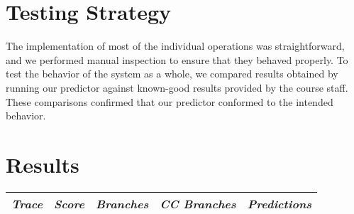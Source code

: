 \documentclass[11pt]{article}
\begin{document}
\section{Testing Strategy}

The implementation of most of the individual operations was straightforward, and we performed manual
inspection to ensure that they behaved properly.  To test the behavior of the system as a whole, we
compared results obtained by running our predictor against known-good results provided by the course
staff.  These comparisons confirmed that our predictor conformed to the intended behavior.

\section{Results}

\begin{tabular}{|l|rrrr|}
\hline
\it Trace & \it Score & \it Branches & \it CC Branches & \it Predictions \\
\hline

\hline
\end{tabular}
\end{document}
